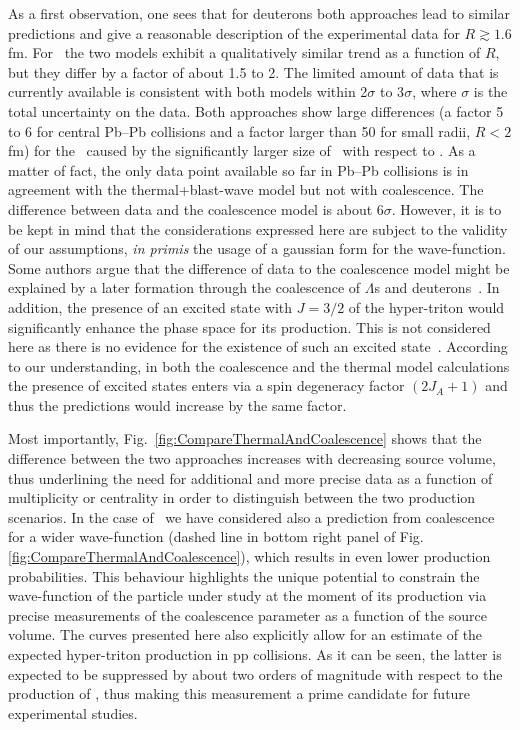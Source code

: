 As a first observation, one sees that for deuterons both approaches lead to similar predictions and give a reasonable description of the experimental data for $R \gtrsim 1.6$ fm. 
For \hethree~the two models exhibit a qualitatively similar trend as a function of $R$, but they differ by a factor of about 1.5 to 2. The limited amount of data that is currently available is consistent with both models within 2$\sigma$ to 3$\sigma$, where $\sigma$ is the total uncertainty on the data. 
Both approaches show large differences (a factor 5 to 6 for central Pb--Pb collisions and a factor larger than 50 for small radii, $R < 2$ fm) for the \hthreelambda\ caused by the significantly larger size of \hthreelambda\ with respect to \hethree. 
As a matter of fact, the only data point available so far in Pb--Pb collisions is in agreement with the thermal+blast-wave model but not with coalescence. The difference between data and the coalescence model is about 6$\sigma$. However, it is to be kept in mind that the considerations expressed here are subject to the validity of our assumptions, \textit{in primis} the usage of a gaussian form for the wave-function.
Some authors argue that the difference of data to the coalescence model might be explained by a later formation through the coalescence of $\Lambda$s and deuterons~\cite{Zhang:2018euf}. 
In addition, the presence of an excited state with $J=3/2$ of the hyper-triton would significantly enhance the phase space for its production. This is not considered here as there is no evidence for the existence of such an excited state~\cite{Mart:1996ay}. According to our understanding, in both the coalescence and the thermal model calculations the presence of excited states enters via a spin degeneracy factor $(2J_{A}+1)$ and thus the predictions would increase by the same factor.

Most importantly, Fig.~\ref{fig:CompareThermalAndCoalescence} shows that the difference between the two approaches increases with decreasing source volume, thus underlining the need for additional and more precise data as a function of multiplicity or centrality in order to distinguish between the two production scenarios. 
In the case of \hthreelambda~we have considered also a prediction from coalescence for a wider wave-function (dashed line in bottom right panel of Fig. \ref{fig:CompareThermalAndCoalescence}), which results in even lower production probabilities. This behaviour highlights the unique potential to constrain the wave-function of the particle under study at the moment of its production via precise measurements of the coalescence parameter as a function of the source volume. The curves presented here also explicitly allow for an estimate of the expected hyper-triton production in pp collisions. As it can be seen, the latter is expected to be suppressed by about two orders of magnitude with respect to the production of \hethree, thus making this measurement a prime candidate for future experimental studies.
 
